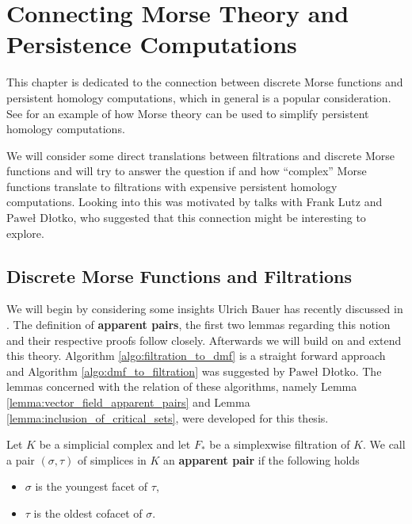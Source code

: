 \chapter{Connecting Morse Theory and Persistence Computations}
\label{ch:connection}
This chapter is dedicated to the connection between discrete Morse functions and persistent homology computations, which in general is a popular consideration. See \cite{MorseTheoryForFiltrations} for an example of how Morse theory can be used to simplify persistent homology computations. 

We will consider some direct translations between filtrations and discrete Morse functions and will try to answer the question if and how \enquote{complex} Morse functions translate to filtrations with expensive persistent homology computations. Looking into this was motivated by talks with Frank Lutz and $\text{Pawe\l}$ $\text{D\l otko}$, who suggested that this connection might be interesting to explore.

\section{Discrete Morse Functions and Filtrations}
We will begin by considering some insights Ulrich Bauer has recently discussed in \cite{bauer2019ripser}. The definition of \textbf{apparent pairs}, the first two lemmas regarding this notion and their respective proofs follow \cite{bauer2019ripser} closely. Afterwards we will build on and extend this theory. Algorithm \ref{algo:filtration_to_dmf} is a straight forward approach and Algorithm \ref{algo:dmf_to_filtration} was suggested by $\text{Pawe\l}$ $\text{D\l otko}$. The lemmas concerned with the relation of these algorithms, namely Lemma \ref{lemma:vector_field_apparent_pairs} and Lemma \ref{lemma:inclusion_of_critical_sets}, were developed for this thesis.

\begin{defi}
Let $K$ be a simplicial complex and let $F_*$ be a simplexwise filtration of $K$. We call a pair $(\sigma,\tau)$ of simplices in $K$ an \textbf{apparent pair} if the following holds
\begin{itemize}
    \item $\sigma$ is the youngest facet of $\tau$,
    \item $\tau$ is the oldest cofacet of $\sigma$.
\end{itemize}{}
\end{defi}

